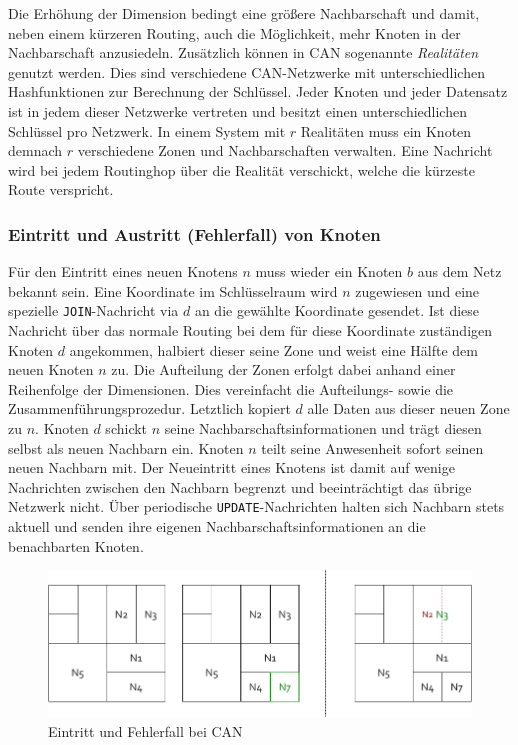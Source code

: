 Die Erhöhung der Dimension bedingt eine größere Nachbarschaft und damit, neben einem kürzeren Routing, auch die Möglichkeit, mehr Knoten in der Nachbarschaft anzusiedeln. Zusätzlich können in CAN sogenannte \emph{Realitäten} genutzt werden. Dies sind verschiedene CAN-Netzwerke mit unterschiedlichen Hashfunktionen zur Berechnung der Schlüssel. Jeder Knoten und jeder Datensatz ist in jedem dieser Netzwerke vertreten und besitzt einen unterschiedlichen Schlüssel pro Netzwerk. In einem System mit $r$ Realitäten muss ein Knoten demnach $r$ verschiedene Zonen und Nachbarschaften verwalten. Eine Nachricht wird bei jedem Routinghop über die Realität verschickt, welche die kürzeste Route verspricht.

\subsubsection{Eintritt und Austritt (Fehlerfall) von Knoten}
Für den Eintritt eines neuen Knotens $n$ muss wieder ein Knoten $b$ aus dem Netz bekannt sein. Eine Koordinate im Schlüsselraum wird $n$ zugewiesen und eine spezielle \texttt{JOIN}-Nachricht via $d$ an die gewählte Koordinate gesendet. Ist diese Nachricht über das normale Routing bei dem für diese Koordinate zuständigen Knoten $d$ angekommen, halbiert dieser seine Zone und weist eine Hälfte dem neuen Knoten $n$ zu. Die Aufteilung der Zonen erfolgt dabei anhand einer Reihenfolge der Dimensionen. Dies vereinfacht die Aufteilungs- sowie die Zusammenführungsprozedur. Letztlich kopiert $d$ alle Daten aus dieser neuen Zone zu $n$. Knoten $d$ schickt $n$ seine Nachbarschaftsinformationen und trägt diesen selbst als neuen Nachbarn ein. Knoten $n$ teilt seine Anwesenheit sofort seinen neuen Nachbarn mit. Der Neueintritt eines Knotens ist damit auf wenige Nachrichten zwischen den Nachbarn begrenzt und beeinträchtigt das übrige Netzwerk nicht. Über periodische \texttt{UPDATE}-Nachrichten halten sich Nachbarn stets aktuell und senden ihre eigenen Nachbarschaftsinformationen an die benachbarten Knoten.

\begin{figure}[htbp]
\centering
\includegraphics{grafics/can_new_node.pdf}
\caption{Eintritt und Fehlerfall bei CAN}
\label{fig:can_new_node}
\end{figure}

